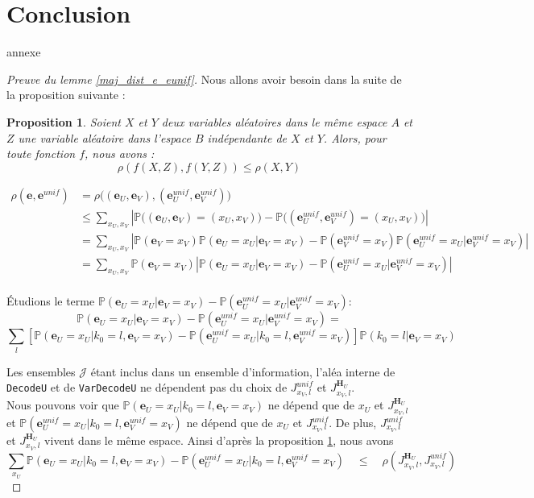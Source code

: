 \documentclass[12pt]{article}
\theoremstyle{plain}
\newtheorem{propo}[thm]{Proposition}
\newcommand{\e}{\mathbf{e}}
\newcommand{\J}{\mathcal{J}}
\begin{document}
\section*{Conclusion}

\newpage







annexe
\begin{proof}[Preuve du lemme \ref{maj_dist_e_eunif}]
Nous allons avoir besoin dans la suite de la proposition suivante :
\begin{propo}\label{rho_f}
Soient $X$ et $Y$ deux variables aléatoires dans le même espace $A$ et $Z$ une variable aléatoire dans l'espace $B$ indépendante de $X$ et $Y$. Alors, pour toute fonction $f$, nous avons : $$ \rho(f(X,Z),f(Y,Z)) \leq \rho(X,Y)$$
\end{propo}

{\scriptsize
\begin{equation*}
\begin{split}
\rho(\e,\e^{unif}) &= \rho\Big((\e_U,\e_V),(\e_U^{unif},\e_V^{unif})\Big)\\
&\leq \sum\limits_{x_U,x_V} \left|\mathbb{P}\Big((\e_U,\e_V)=(x_U,x_V)\Big) - \mathbb{P}\Big((\e_U^{unif},\e_V^{unif})=(x_U,x_V)\Big)\right|\\
&= \sum\limits_{x_U,x_V} \left|\mathbb{P}(\e_V = x_V)\mathbb{P}(\e_U=x_U|\e_V=x_V) - \mathbb{P}(\e_V^{unif} = x_V)\mathbb{P}(\e_U^{unif}=x_U | \e_V^{unif}=x_V)\right|\\
&= \sum\limits_{x_U,x_V} \mathbb{P}(\e_V = x_V)\left|\mathbb{P}(\e_U=x_U|\e_V=x_V) - \mathbb{P}(\e_U^{unif}=x_U | \e_V^{unif}=x_V)\right|\\
\end{split}
\end{equation*}}

Étudions le terme  $\mathbb{P}(\e_U=x_U|\e_V=x_V) - \mathbb{P}(\e_U^{unif}=x_U | \e_V^{unif}=x_V)$:
{\scriptsize
$$ \mathbb{P}(\e_U=x_U|\e_V=x_V) - \mathbb{P}(\e_U^{unif}=x_U | \e_V^{unif}=x_V) =  $$
$$ \sum\limits_l \left[ \mathbb{P}(\e_U=x_U|k_0 = l,\e_V=x_V) - \mathbb{P}(\e_U^{unif}=x_U |k_0 = l, \e_V^{unif}=x_V) \right] \mathbb{P}\left(k_0 = l | \e_V =x_V\right)$$
}

Les ensembles $\J$ étant inclus dans un ensemble d'information, l'aléa interne de \verb|DecodeU| et de \verb|VarDecodeU| ne dépendent pas du choix de $J_{x_V,l}^{unif}$ et $J_{x_V, l}^{\mathbf{H}_U}$. \\
Nous pouvons voir que $\mathbb{P}(\e_U=x_U|k_0 = l,\e_V=x_V)$ ne dépend que de $x_U$ et $J_{x_V, l}^{\mathbf{H}_U}$ et   $\mathbb{P}(\e_U^{unif}=x_U |k_0 = l, \e_V^{unif}=x_V)$ ne dépend que de $x_U$ et $J_{x_V, l}^{unif}$. 
De plus, $J_{x_V,l}^{unif}$ et $J_{x_V, l}^{\mathbf{H}_U}$ vivent dans le même espace.
Ainsi d'après la proposition \ref{rho_f}, nous avons 
{\scriptsize
$$ \sum\limits_{x_U}\mathbb{P}(\e_U=x_U|k_0 = l,\e_V=x_V) - \mathbb{P}(\e_U^{unif}=x_U |k_0 = l, \e_V^{unif}=x_V)\quad \leq\quad \rho(J_{x_V, l}^{\mathbf{H}_U},J_{x_V, l}^{unif})$$
}



\end{proof}
\end{document}

